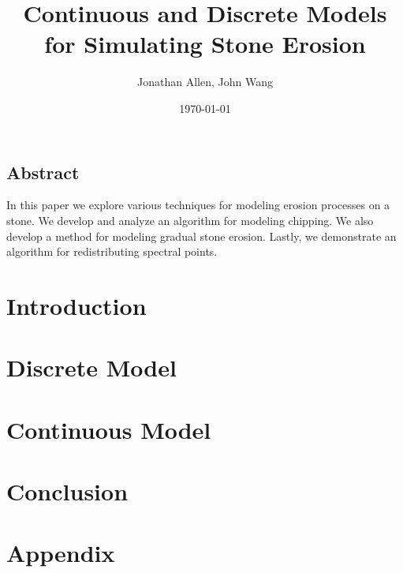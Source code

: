 \documentclass[12pt]{amsart}   %
\begin{document}
\graphicspath{ {figures/} }

\title[Shape of Stones]{Continuous and Discrete Models for Simulating Stone Erosion}
 
\author{Jonathan Allen, John Wang}
\date{\today}

\maketitle

\subsection*{Abstract}

In this paper we explore various techniques for modeling erosion processes on a stone. We develop and analyze an algorithm for modeling chipping. We also develop a method for modeling gradual stone erosion. Lastly, we demonstrate an algorithm for redistributing spectral points.

\section{Introduction}


\section{Discrete Model}


\section{Continuous Model}


\section{Conclusion}


\section*{Appendix}



\end{document}
